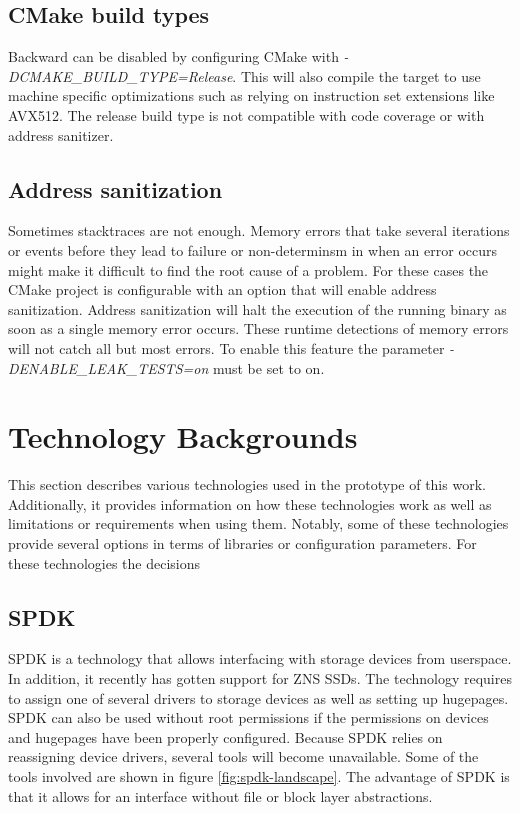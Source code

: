 \documentclass[conference]{IEEEtran}
\begin{document}
\subsection{CMake build types}

Backward can be disabled by configuring CMake with
\textit{-DCMAKE\_BUILD\_TYPE=Release}. This will also compile the target to use
machine specific optimizations such as relying on instruction set extensions
like AVX512. The release build type is not compatible with code coverage or with
address sanitizer.

\subsection{Address sanitization}

Sometimes stacktraces are not enough. Memory errors that take several iterations
or events before they lead to failure or non-determinsm in when an error occurs
might make it difficult to find the root cause of a problem. For these cases the
CMake project is configurable with an option that will enable address
sanitization. Address sanitization will halt the execution of the running binary
as soon as a single memory error occurs. These runtime detections of memory
errors will not catch all but most errors. To enable this feature the parameter
\textit{-DENABLE\_LEAK\_TESTS=on} must be set to on.

\section{Technology Backgrounds} \label{technology}

This section describes various technologies used in the prototype of this work.
Additionally, it provides information on how these technologies work as well as
limitations or requirements when using them. Notably, some of these technologies
provide several options in terms of libraries or configuration parameters. For
these technologies the decisions

\subsection{SPDK}

SPDK is a technology that allows interfacing with storage devices from userspace.
In addition, it recently has gotten support for ZNS SSDs. The technology
requires to assign one of several drivers to storage devices as well as setting
up hugepages. SPDK can also be used without root permissions if the
permissions on devices and hugepages have been properly configured. Because
SPDK relies on reassigning device drivers, several tools will become
unavailable. Some of the tools involved are shown in figure
\ref{fig:spdk-landscape}. The advantage of SPDK is that it allows for an
interface without file or block layer abstractions.
\end{document}
